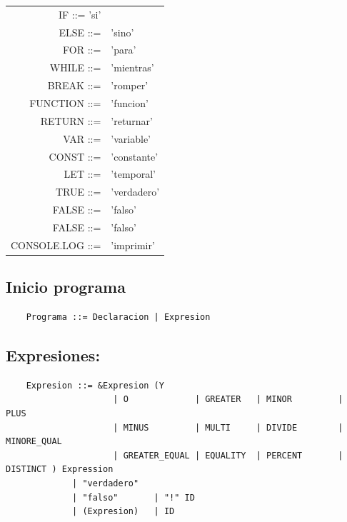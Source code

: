 \begin{center}
    \resizebox{5.5cm}{!} {
    \begin{tabular}{r l}
        IF ::= 'si' \\
        ELSE ::= &'sino'\\
        FOR ::= &'para'\\
        WHILE ::= &'mientras'\\
        BREAK ::= &'romper'\\ 
        FUNCTION ::= &'funcion'\\
        RETURN ::= &'returnar'\\
        VAR ::= &'variable'\\
        CONST ::= &'constante'\\    
        LET ::= &'temporal'\\
        TRUE ::= &'verdadero'\\
        FALSE ::= &'falso'\\
        FALSE ::= &'falso'\\
        CONSOLE.LOG ::= & 'imprimir' \\
        
      
    \end{tabular}
    }
\end{center}
        
        
        
        
        
        
        
        
        
\subsection{Inicio programa}

\begin{verbatim}
    Programa ::= Declaracion | Expresion
\end{verbatim}

\subsection{Expresiones:}

\begin{verbatim}
    Expresion ::= &Expresion (Y 
                     | O             | GREATER   | MINOR         | PLUS 
                     | MINUS         | MULTI     | DIVIDE        | MINORE_QUAL 
                     | GREATER_EQUAL | EQUALITY  | PERCENT       | DISTINCT ) Expression  
             | "verdadero"  
             | "falso"       | "!" ID 
             | (Expresion)   | ID 
    

\end{verbatim}

